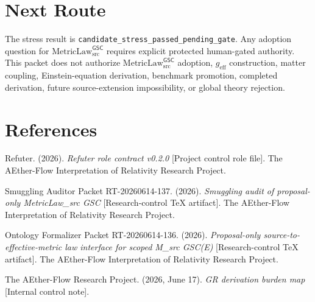 \documentclass[11pt]{article}
\newcommand{\MetricLaw}{\mathrm{MetricLaw}_{\mathrm{src}}^{\mathsf{GSC}}}
\newcommand{\geff}{g_{\mathrm{eff}}}
\begin{document}
\section{Next Route}

The stress result is
\texttt{candidate\_stress\_passed\_pending\_gate}. Any adoption question for
\(\MetricLaw\) requires explicit protected human-gated authority. This packet
does not authorize \(\MetricLaw\) adoption, \(\geff\) construction, matter
coupling, Einstein-equation derivation, benchmark promotion, completed
derivation, future source-extension impossibility, or global theory rejection.

\section*{References}

Refuter. (2026). \textit{Refuter role contract v0.2.0} [Project control role
file]. The AEther-Flow Interpretation of Relativity Research Project.

Smuggling Auditor Packet RT-20260614-137. (2026). \textit{Smuggling audit of
proposal-only MetricLaw\_src GSC} [Research-control TeX artifact]. The
AEther-Flow Interpretation of Relativity Research Project.

Ontology Formalizer Packet RT-20260614-136. (2026). \textit{Proposal-only
source-to-effective-metric law interface for scoped M\_src GSC(E)}
[Research-control TeX artifact]. The AEther-Flow Interpretation of Relativity
Research Project.

The AEther-Flow Research Project. (2026, June 17). \textit{GR derivation
burden map} [Internal control note].
\end{document}
